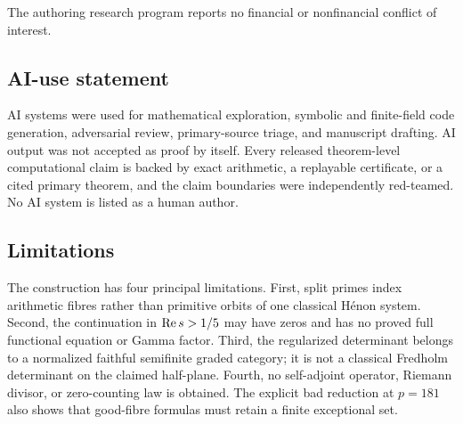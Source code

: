 The authoring research program reports no financial or nonfinancial conflict
of interest.

\subsection*{AI-use statement}

AI systems were used for mathematical exploration, symbolic and
finite-field code generation, adversarial review, primary-source triage,
and manuscript drafting.  AI output was not accepted as proof by itself.
Every released theorem-level computational claim is backed by exact
arithmetic, a replayable certificate, or a cited primary theorem, and the
claim boundaries were independently red-teamed.  No AI system is listed as
a human author.

\subsection*{Limitations}

The construction has four principal limitations.  First, split primes index
arithmetic fibres rather than primitive orbits of one classical H\'enon
system.  Second, the continuation in \(\operatorname{Re} s>1/5\) may have zeros and
has no proved full functional equation or Gamma factor.  Third, the
regularized determinant belongs to a normalized faithful semifinite graded
category; it is not a classical Fredholm determinant on the claimed
half-plane.  Fourth, no self-adjoint operator, Riemann divisor, or
zero-counting law is obtained.  The explicit bad reduction at \(p=181\)
also shows that good-fibre formulas must retain a finite exceptional set.
